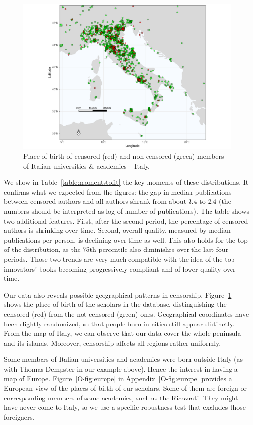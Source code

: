 \begin{figure}[p]
\begin{center}
\includegraphics[width=.57\textwidth,trim=3cm 0cm 3cm 0cm,clip]{map-italy.pdf}
\end{center}
\caption{Place of birth of censored (red) and non censored (green) members of Italian universities \& academies -- Italy. }\label{fig:italy}
\end{figure}

We show in Table~\ref{table:momentstofit} the key moments of these distributions. It confirms what we expected from the figures: the gap in median publications between censored authors and all authors shrank from about 3.4 to 2.4 (the numbers should be interpreted as log of number of publications).  The table shows two additional features. First, after the second period, the percentage of censored authors is shrinking over time. Second, overall quality, measured by median publications per person, is declining over time as well. This also holds for the top of the distribution, as the 75th percentile also diminishes over the last four periods. Those two trends are very much compatible with the idea of the top innovators' books becoming progressively compliant and of lower quality over time.




Our data also reveals possible geographical patterns in censorship. Figure~\ref{fig:italy} shows the place of birth of the scholars in the database, distinguishing the censored (red) from the not censored (green) ones. Geographical coordinates have been slightly randomized, so that people born in cities still appear distinctly. From the map of Italy, we can observe that our data cover the whole peninsula and its islands. Moreover, censorship  affects all regions rather uniformly.



Some members of Italian universities and academies were born outside Italy (as with Thomas Dempster in our example above). Hence the interest in having a map of Europe. Figure~\ref{O-fig:europe} in Appendix~\ref{O-fig:europe} provides a European view of the places of birth of our scholars. Some of them are foreign or corresponding members of some academies, such as the Ricovrati. They might have never come to Italy, so we use a specific robustness test that excludes those foreigners.





